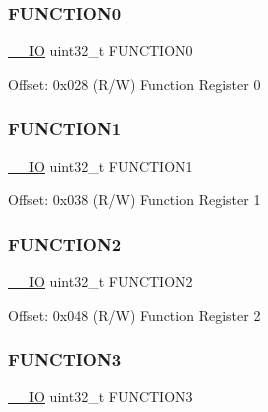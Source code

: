\subsubsection{\texorpdfstring{F\+U\+N\+C\+T\+I\+O\+N0}{FUNCTION0}}
{\footnotesize\ttfamily \mbox{\hyperlink{core__cm3_8h_aec43007d9998a0a0e01faede4133d6be}{\+\_\+\+\_\+\+IO}} uint32\+\_\+t F\+U\+N\+C\+T\+I\+O\+N0}

Offset\+: 0x028 (R/W) Function Register 0 \mbox{\label{struct_d_w_t___type_afbea004f9e2860b9f450bcea21eec318}} 
\subsubsection{\texorpdfstring{F\+U\+N\+C\+T\+I\+O\+N1}{FUNCTION1}}
{\footnotesize\ttfamily \mbox{\hyperlink{core__cm3_8h_aec43007d9998a0a0e01faede4133d6be}{\+\_\+\+\_\+\+IO}} uint32\+\_\+t F\+U\+N\+C\+T\+I\+O\+N1}

Offset\+: 0x038 (R/W) Function Register 1 \mbox{\label{struct_d_w_t___type_a93d1f9f928292854f16333500e554c41}} 
\subsubsection{\texorpdfstring{F\+U\+N\+C\+T\+I\+O\+N2}{FUNCTION2}}
{\footnotesize\ttfamily \mbox{\hyperlink{core__cm3_8h_aec43007d9998a0a0e01faede4133d6be}{\+\_\+\+\_\+\+IO}} uint32\+\_\+t F\+U\+N\+C\+T\+I\+O\+N2}

Offset\+: 0x048 (R/W) Function Register 2 \mbox{\label{struct_d_w_t___type_ad3bf90012b7b60cd030c54ed0ec0442d}} 
\subsubsection{\texorpdfstring{F\+U\+N\+C\+T\+I\+O\+N3}{FUNCTION3}}
{\footnotesize\ttfamily \mbox{\hyperlink{core__cm3_8h_aec43007d9998a0a0e01faede4133d6be}{\+\_\+\+\_\+\+IO}} uint32\+\_\+t F\+U\+N\+C\+T\+I\+O\+N3}

